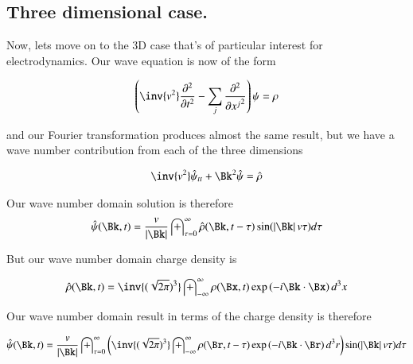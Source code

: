 \documentclass{article}
\newcommand{\PDSq}[2]{\frac{\partial^2 {#2}}{\partial {#1}^2}}
\newcommand{\IIinf}[0]{ \int_{-\infty}^\infty }
\begin{document}

\subsection{ Three dimensional case. }

Now, lets move on to the 3D case that's of particular interest for electrodynamics.  Our wave equation is now of the form

\begin{align}
\left( \inv{v^2} \PDSq{t}{} -\sum_j \PDSq{x^j}{} \right)\psi = \rho
\end{align}

and our Fourier transformation produces almost the same result, but we have a wave number contribution from each of the three dimensions

\begin{align}
\inv{v^2}\hat{\psi}_{tt} + \Bk^2 \hat{\psi} = \hat{\rho}
\end{align}

Our wave number domain solution is therefore
\begin{align}\label{eqn:waveNumDomainSolution}
\hat{\psi}(\Bk, t) = \frac{v}{\Abs{\Bk}} \int_{\tau = 0}^\infty \hat{\rho}(\Bk, t-\tau) \sin( \Abs{\Bk} v \tau ) d\tau
\end{align}

But our wave number domain charge density is

\begin{align*}
\hat{\rho}(\Bk, t) &= \inv{(\sqrt{2\pi})^3} \IIinf \rho(\Bx, t) \exp\left( -i \Bk \cdot \Bx \right) d^3 x \\
\end{align*}

Our wave number domain result in terms of the charge density is therefore

\begin{align*}
\hat{\psi}(\Bk, t) =
\frac{v}{\Abs{\Bk}} \int_{\tau = 0}^\infty
\left(
\inv{(\sqrt{2\pi})^3} \IIinf \rho(\Br, t-\tau) \exp\left( -i \Bk \cdot \Br \right) d^3 r
\right)
\sin( \Abs{\Bk} v \tau ) d\tau
\end{align*}
\end{document}
